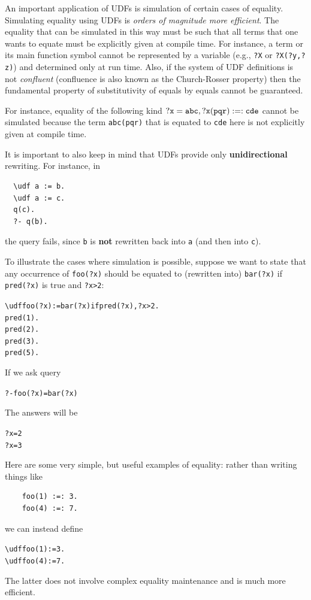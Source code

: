 \documentclass[11pt]{article}
\newcommand{\bs}{\textbackslash}
\begin{document}
An important application of UDFs is simulation of certain cases of
equality.
Simulating equality using UDFs is \emph{orders of magnitude more
  efficient}.  
The equality that can be simulated in this way must be such
that all terms that one wants to equate must be explicitly given at
compile time. For instance, a term or its main function symbol cannot be
represented by a variable (e.g., \texttt{?X} or \texttt{?X(?y,?z)})  and
determined only at run time.
Also, if the system of UDF definitions is not \emph{confluent} 
(confluence is also known as the Church-Rosser property) then
the fundamental property of
substitutivity of equals by equals cannot be guaranteed.


For instance, equality of the following kind $\tt ?x=abc, ?x(pqr) :=: cde$
cannot be simulated because the term \texttt{abc(pqr)} that is equated to
\texttt{cde} here is not explicitly given at compile time.  

It is important to also keep in mind that UDFs provide only \textbf{unidirectional}
rewriting. For instance, in
\begin{verbatim}
  \udf a := b.
  \udf a := c.
  q(c).
  ?- q(b).
\end{verbatim}
the query fails, since \texttt{b} is \textbf{not} rewritten back into \texttt{a}
(and then into \texttt{c}).   

To illustrate the cases where simulation is possible, suppose we want to
state that any occurrence of \texttt{foo(?x)} should be equated to (rewritten
into) \texttt{bar(?x)} if \texttt{pred(?x)} is true and \texttt{?x>2}: 
\begin{alltt}
    \bs{}udf foo(?x):=bar(?x) if  pred(?x), ?x>2.
    pred(1).
    pred(2).
    pred(3).
    pred(5).
\end{alltt}

If we ask query
\begin{alltt}
    ?- foo(?x)=bar(?x)
\end{alltt}
The answers will be
\begin{alltt}
    ?x=2
    ?x=3
\end{alltt}


Here are some very simple, but useful examples of equality: rather than
writing things like
\begin{verbatim}
    foo(1) :=: 3.
    foo(4) :=: 7.
\end{verbatim}
we can instead define
\begin{alltt}
    \bs{}udf foo(1):=3.
    \bs{}udf foo(4):=7.
\end{alltt}
The latter does not involve complex equality maintenance and is much more
efficient.
\end{document}
